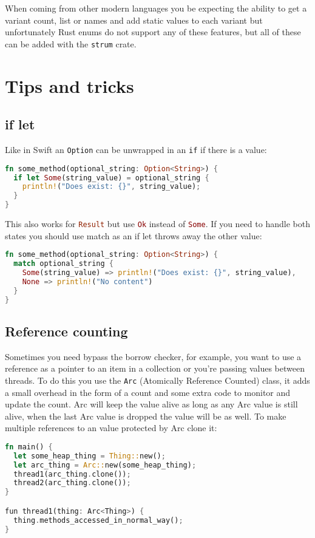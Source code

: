 \documentclass[a4paper,11pt]{article}
\begin{document}
When coming from other modern languages you be expecting the ability to get a variant count, list or names and add static values to each variant but unfortunately Rust enums do not support any of these features, but all of these can be added with the \lstinline{strum} crate. 

\newpage
\section{Tips and tricks}
\medskip
\subsection{if let}

Like in Swift an \lstinline[language=Kotlin]{Option} can be unwrapped in an \lstinline|if| if there is a value:

\begin{lstlisting}[language=Rust,frame=single]
fn some_method(optional_string: Option<String>) {
  if let Some(string_value) = optional_string {
    println!("Does exist: {}", string_value);
  }
}
\end{lstlisting}

This also works for \lstinline[language=Rust]{Result} but use \lstinline[language=Rust]{Ok} instead of \lstinline[language=Rust]{Some}. If you need to handle both states you should use match as an if let throws away the other value:
\begin{lstlisting}[language=Rust,frame=single]
fn some_method(optional_string: Option<String>) {
  match optional_string {
    Some(string_value) => println!("Does exist: {}", string_value),
    None => println!("No content")
  }
}
\end{lstlisting}
\medskip
\medskip
\subsection{Reference counting}

Sometimes you need bypass the borrow checker, for example, you want to use a reference as a pointer to an item in a collection or you're passing values between threads. To do this you use the \lstinline[language=Rust]{Arc} (Atomically Reference Counted) class, it adds a small overhead in the form of a count and some extra code to monitor and update the count. Arc will keep the value alive as long as any Arc value is still alive, when the last Arc value is dropped the value will be as well. To make multiple references to an value protected by Arc clone it:
\begin{lstlisting}[language=Rust,frame=single]
fn main() {
  let some_heap_thing = Thing::new();
  let arc_thing = Arc::new(some_heap_thing);
  thread1(arc_thing.clone()); 
  thread2(arc_thing.clone()); 
}

fun thread1(thing: Arc<Thing>) {
  thing.methods_accessed_in_normal_way();
}
\end{lstlisting}
\end{document}
